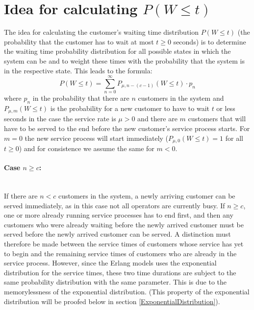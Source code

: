 \documentclass[a4paper,11pt,oneside]{article}
\theoremstyle{definition}
\begin{document}
\section[Idea for calculating P(W<=t)]{Idea for calculating $P(W\le t)$}

The idea for calculating the customer's waiting time distribution $P(W\le t)$ (the probability that the customer has to wait at most $t\ge0$ seconds) is to determine the waiting time probability distribution for all possible states in which the system can be and to weight these times with the probability that the system is in the respective state. This leads to the formula:
\begin{equation}\label{eq:WaitingTimeDistribution1}
P(W\le t)=\sum_{n=0}^\infty P_{\mu,n-(c-1)}(W\le t)\cdot p_n
\end{equation}
where $p_n$ in the probability that there are $n$ customers in the system and $P_{\mu,m}(W\le t)$ is the probability for a new customer to have to wait $t$ or less seconds in the case the service rate is $\mu>0$ and there are $m$ customers that will have to be served to the end before the new customer's service process starts. For $m=0$ the new service process will start immediately ($P_{\mu,0}(W\le t)=1$ for all $t\ge0$) and for consistence we assume the same for $m<0$.

\paragraph{Case $n\ge c$:}~\\
If there are $n<c$ customers in the system, a newly arriving customer can be served immediately, as in this case not all operators are currently busy. If $n\ge c$, one or more already running service processes has to end first, and then any customers who were already waiting before the newly arrived customer must be served before the newly arrived customer can be served. A distinction must therefore be made between the service times of customers whose service has yet to begin and the remaining service times of customers who are already in the service process. However, since the Erlang models uses the exponential distribution for the service times, these two time durations are subject to the same probability distribution with the same parameter. This is due to the memorylessness of the exponential distribution. (This property of the exponential distribution will be proofed below in section \ref{ExponentialDistribution}).
\end{document}

